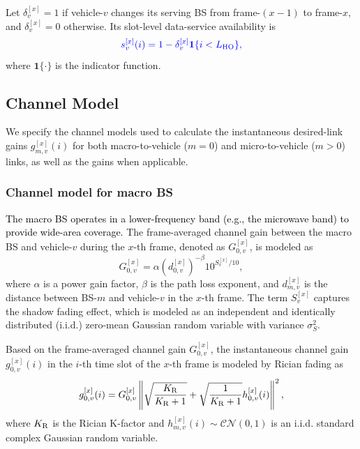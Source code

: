 \documentclass[conference, a4paper]{IEEEtran}
\newcommand{\rev}[1]{\textcolor{revisioncolor}{{}#1}}
\newif\ifshowdeletions
\newcommand{\currentdel}[1]{\ifshowdeletions\textcolor{deletioncolor}{\sout{#1}}\fi}
\theoremstyle{remark}
\begin{document}
\rev{Let $\delta_v^{[x]}=1$ if vehicle-$v$ changes its serving BS from frame-$(x-1)$ to frame-$x$, and $\delta_v^{[x]}=0$ otherwise. Its slot-level data-service availability is}
\begin{equation}
    \rev{s_v^{[x]}(i)=1-\delta_v^{[x]}\mathbf{1}\{i<L_{\rm HO}\},}
    \label{eq:HO_availability}
\end{equation}
\rev{where $\mathbf{1}\{\cdot\}$ is the indicator function.}

\subsection{Channel Model}

We specify the channel models used to calculate the instantaneous desired-link gains $g_{m,v}^{[x]}(i)$ for both macro-to-vehicle ($m=0$) and micro-to-vehicle ($m>0$) links, as well as the \currentdel{interference-link} gains when applicable.

\subsubsection{Channel model for macro BS}

\textcolor{black}{
The macro BS operates in a lower-frequency band (e.g., the microwave band) to provide wide-area coverage. 
}
The frame-averaged channel gain between the macro BS and vehicle-$v$ during the $x$-th frame, denoted as $G_{0,v}^{[x]}$, is modeled as
\begin{equation}
    G_{0,v}^{[x]} = \alpha \left(d_{0,v}^{[x]}\right)^{-\beta} 10^{S_v^{[x]}/10},
    \label{eq:avg channel gain}
\end{equation}
where $\alpha$ is a power gain factor, $\beta$ is the path loss exponent, and $d_{m,v}^{[x]}$ is the distance between BS-$m$ and vehicle-$v$ in the $x$-th frame. The term $S_v^{[x]}$ captures the shadow fading effect, which is modeled as an independent and identically distributed (i.i.d.) zero-mean Gaussian random variable with variance $\sigma_S^2$. 

Based on the frame-averaged channel gain $G_{0,v}^{[x]}$, the instantaneous channel gain $g_{0,v}^{[x]}(i)$ in the $i$-th time slot of the $x$-th frame is modeled by Rician fading as
\begin{equation}
    g_{0,v}^{[x]}(i) = G_{0,v}^{[x]}\left\|\sqrt{\frac{K_{\rm R}}{K_{\rm R}+1}} + \sqrt{\frac{1}{K_{\rm R}+1}} h_{0,v}^{[x]}(i)\right\|^2,
    \label{eq:instant channel condition}
\end{equation}
where $K_{\rm R}$ is the Rician K-factor and $h_{m,v}^{[x]}(i) \sim \mathcal{CN}\left(0,1\right)$ is an i.i.d. standard complex Gaussian random variable. 
\end{document}
